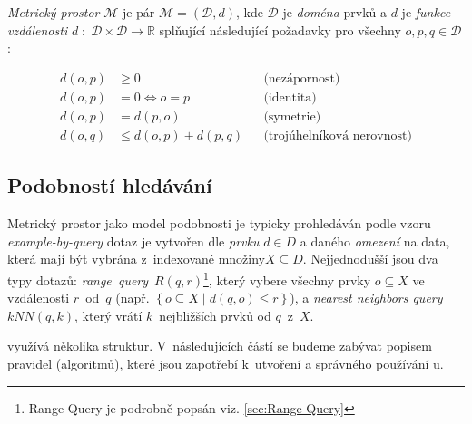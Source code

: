 \emph{Metrický prostor }$\mathcal{M}$ je pár $\mathcal{M}=(\mathcal{D},d)$,
kde $\mathcal{D}$ je \emph{doména} prvků a $d$ je \emph{funkce vzdálenosti}
$d\;:\;\mathcal{D}\times\mathcal{D}\rightarrow\mathbb{R}$ splňující
následující požadavky pro všechny $o,p,q\in\mathcal{D}$:

\begin{align*}
d(o,p) & \geq0 &  & \textrm{(nezápornost)}\\
d(o,p) & =0\Longleftrightarrow o=p &  & \textrm{(identita)}\\
d(o,p) & =d(p,o) &  & \textrm{(symetrie)}\\
d(o,q) & \leq d(o,p)+d(p,q) &  & \textrm{(trojúhelníková nerovnost)}
\end{align*}



\subsection{Podobností hledávání}

Metrický prostor jako model podobnosti je typicky prohledáván podle
vzoru \emph{example-by-query} \textendash{} dotaz je vytvořen dle
\emph{prvku} $d\in D$ a daného \emph{omezení} na data, která mají
být vybrána z~indexované množiny$X\subseteq D$\@. Nejjednodušší
jsou dva typy dotazů: \emph{range~query}~$R(q,r)$\footnote{Range Query je podrobně popsán viz. \vref{sec:Range-Query}
}, který vybere všechny prvky $o\subseteq X$ ve vzdálenosti $r$~od~$q$
(např. $\left\{ o\subseteq X\mid d(q,o)\leq r\right\} $), a \emph{nearest
neighbors query} $kNN(q,k)$, který vrátí $k$~nejbližších prvků
od $q$~z~$X$\@.

\MIndex{} využívá několika struktur\@. V~následujících částí se budeme
zabývat popisem pravidel (algoritmů), které jsou zapotřebí k~utvoření
a správného používání \MIndex u.